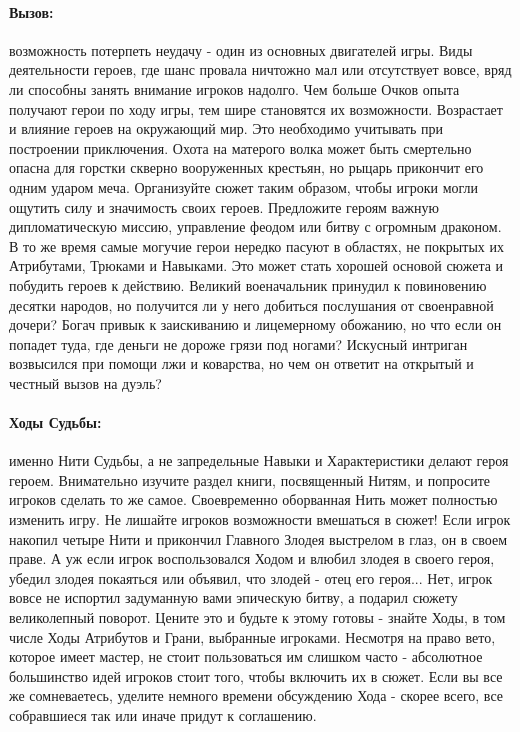 \paragraph{Вызов:} возможность потерпеть неудачу - один из основных двигателей игры. Виды деятельности героев, где шанс провала ничтожно мал или отсутствует вовсе, вряд ли способны занять внимание игроков надолго.
\newline
Чем больше Очков опыта получают герои по ходу игры, тем шире становятся их возможности. Возрастает и влияние героев на окружающий мир. Это необходимо учитывать при построении приключения. Охота на матерого волка может быть смертельно опасна для горстки скверно вооруженных крестьян, но рыцарь прикончит его одним ударом меча. Организуйте сюжет таким образом, чтобы игроки могли ощутить силу и значимость своих героев. Предложите героям важную дипломатическую миссию, управление феодом или битву с огромным драконом.
\newline
В то же время самые могучие герои нередко пасуют в областях, не покрытых их Атрибутами, Трюками и Навыками. Это может стать хорошей основой сюжета и побудить героев к действию. Великий военачальник принудил к повиновению десятки народов, но получится ли у него добиться послушания от своенравной дочери? Богач привык к заискиванию и лицемерному обожанию, но что если он попадет туда, где деньги не дороже грязи под ногами? Искусный интриган возвысился при помощи лжи и коварства, но чем он ответит на открытый и честный вызов
на дуэль?
\paragraph{Ходы Судьбы:} именно Нити Судьбы, а не запредельные Навыки и Характеристики делают героя героем. Внимательно изучите раздел книги, посвященный Нитям, и попросите игроков сделать то же самое. Своевременно оборванная Нить может полностью изменить игру. Не лишайте игроков возможности вмешаться в сюжет! Если игрок накопил четыре Нити и прикончил Главного Злодея выстрелом в глаз, он в своем праве. А уж если игрок воспользовался Ходом и влюбил злодея в своего героя, убедил злодея покаяться или объявил, что злодей - отец его героя... Нет, игрок вовсе не испортил задуманную вами эпическую битву, а подарил сюжету великолепный поворот. Цените это и будьте к этому готовы - знайте Ходы, в том числе Ходы Атрибутов и Грани, выбранные игроками. Несмотря на право вето, которое имеет мастер, не стоит пользоваться им слишком часто - абсолютное большинство идей игроков стоит того, чтобы включить их в сюжет. Если вы все же сомневаетесь, уделите немного времени обсуждению Хода - скорее всего, все собравшиеся так или иначе придут к соглашению.
